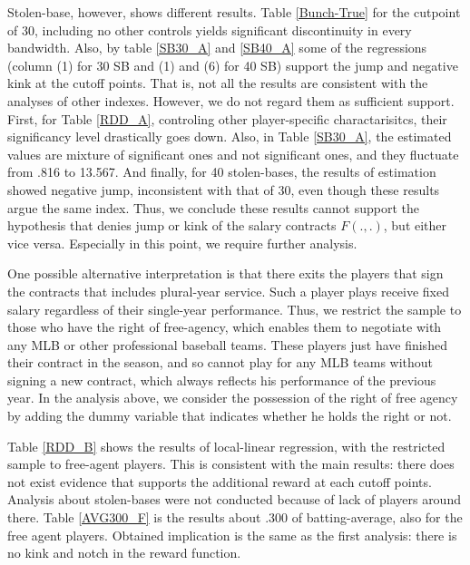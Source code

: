 \documentclass[dvipdfmx, 12pt]{article}
\begin{document}
Stolen-base, however, shows different results. Table \ref{Bunch-True} for the cutpoint of 30, including no other controls yields significant discontinuity in every bandwidth. Also, by table \ref{SB30_A} and \ref{SB40_A} some of the regressions (column (1) for 30 SB and (1) and (6) for 40 SB) support the jump and negative kink at the cutoff points. That is, not all the results are consistent with the analyses of other indexes. However, we do not regard them as sufficient support. First, for Table \ref{RDD_A}, controling other player-specific charactarisitcs, their significancy level drastically goes down. Also, in Table \ref{SB30_A}, the estimated values are mixture of significant ones and not significant ones, and they fluctuate from .816 to 13.567. And finally, for 40 stolen-bases, the results of estimation showed negative jump, inconsistent with that of 30, even though these results argue the same index. Thus, we conclude these results cannot support the hypothesis that denies jump or kink of the salary contracts $F(.,.)$, but either vice versa. Especially in this point, we require further analysis.

One possible alternative interpretation is that there exits the players that sign the contracts that includes plural-year service. Such a player plays receive fixed salary regardless of their single-year performance. Thus, we restrict the sample to those who have the right of free-agency, which enables them to negotiate with any MLB or other professional baseball teams. These players just have finished their contract in the season, and so cannot play for any MLB teams without signing a new contract, which always reflects his performance of the previous year. In the analysis above, we consider the possession of the right of free agency by adding the dummy variable that indicates whether he holds the right or not.

Table \ref{RDD_B} shows the results of local-linear regression, with the restricted sample to free-agent players. This is consistent with the main results: there does not exist evidence that supports the additional reward at each cutoff points. Analysis about stolen-bases were not conducted because of lack of players around there. Table \ref{AVG300_F} is the results about .300 of batting-average, also for the free agent players. Obtained implication is the same as the first analysis: there is no kink and notch in the reward function.
\end{document}
